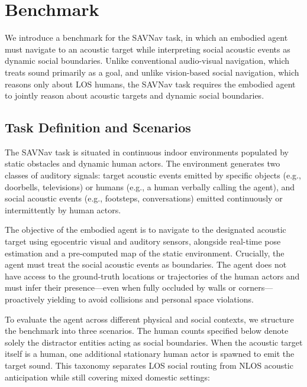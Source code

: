 \section{Benchmark}
\label{sec:benchmark}

We introduce a benchmark for the SAVNav task, in which an embodied agent must navigate to an acoustic target while interpreting social acoustic events as dynamic social boundaries. Unlike conventional audio-visual navigation, which treats sound primarily as a goal, and unlike vision-based social navigation, which reasons only about LOS humans, the SAVNav task requires the embodied agent to jointly reason about acoustic targets and dynamic social boundaries.

\subsection{Task Definition and Scenarios}
\label{subsec:benchmark-task}

The SAVNav task is situated in continuous indoor environments populated by static obstacles and dynamic human actors. The environment generates two classes of auditory signals: target acoustic events emitted by specific objects (e.g., doorbells, televisions) or humans (e.g., a human verbally calling the agent), and social acoustic events (e.g., footsteps, conversations) emitted continuously or intermittently by human actors.

The objective of the embodied agent is to navigate to the designated acoustic target using egocentric visual and auditory sensors, alongside real-time pose estimation and a pre-computed map of the static environment. Crucially, the agent must treat the social acoustic events as boundaries. The agent does not have access to the ground-truth locations or trajectories of the human actors and must infer their presence—even when fully occluded by walls or corners—proactively yielding to avoid collisions and personal space violations.

To evaluate the agent across different physical and social contexts, we structure the benchmark into three scenarios. The human counts specified below denote solely the distractor entities acting as social boundaries. When the acoustic target itself is a human, one additional stationary human actor is spawned to emit the target sound. This taxonomy separates LOS social routing from NLOS acoustic anticipation while still covering mixed domestic settings:

